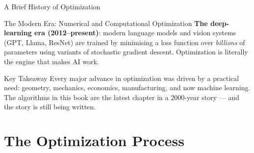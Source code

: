 \documentclass[aspectratio=169,10pt]{beamer}
\begin{document}
\begin{frame}[allowframebreaks]{A Brief History of Optimization}
\begin{block}{The Modern Era: Numerical and Computational Optimization}
    \medskip
    \textbf{The deep-learning era (2012--present)}: modern language models and
    vision systems (GPT, Llama, ResNet) are trained by minimising a loss
    function over \emph{billions} of parameters using variants of stochastic
    gradient descent.  Optimization is literally the engine that makes AI work.
  \end{block}

  \begin{alertblock}{Key Takeaway}
    Every major advance in optimization was driven by a practical need: geometry,
    mechanics, economics, manufacturing, and now machine learning.  The algorithms
    in this book are the latest chapter in a 2000-year story --- and the story
    is still being written.
  \end{alertblock}

\end{frame}

\section{The Optimization Process}
\end{document}

